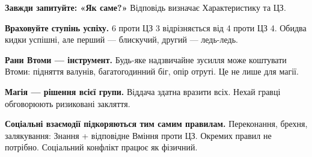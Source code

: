 \documentclass[10pt,a4paper]{article}
\begin{document}
\textbf{Завжди запитуйте: «Як саме?»} Відповідь визначає Характеристику та ЦЗ.

\textbf{Враховуйте ступінь успіху.} 6 проти ЦЗ 3 відрізняється від 4 проти ЦЗ 4. Обидва кидки успішні, але перший — блискучий, другий — ледь-ледь.

\textbf{Рани Втоми — інструмент.} Будь-яке надзвичайне зусилля може коштувати Втоми: підняття валунів, багатогодинний біг, опір отруті. Це не лише для магії.

\textbf{Магія — рішення всієї групи.} Віддача здатна вразити всіх. Нехай гравці обговорюють ризиковані закляття.

\textbf{Соціальні взаємодії підкоряються тим самим правилам.} Переконання, брехня, залякування: Знання + відповідне Вміння проти ЦЗ. Окремих правил не потрібно. Соціальний конфлікт працює як фізичний.
\par\endgroup
{}
\end{document}
